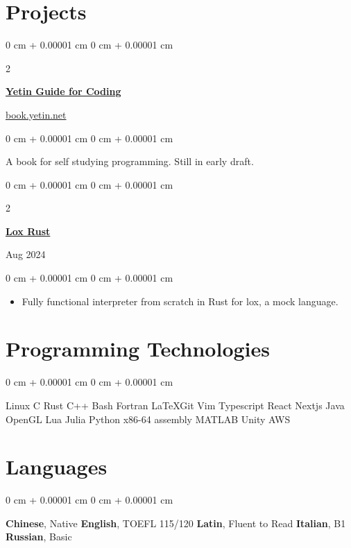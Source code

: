 \documentclass[10pt, letterpaper]{article}
\newenvironment{highlights}{
    \begin{itemize}[
        topsep=0.10 cm,
        parsep=0.10 cm,
        partopsep=0pt,
        itemsep=0pt,
        leftmargin=0 cm + 10pt
    ]
}{
    \end{itemize}
} %
\newenvironment{onecolentry}{
    \begin{adjustwidth}{
        0 cm + 0.00001 cm
    }{
        0 cm + 0.00001 cm
    }
}{
    \end{adjustwidth}
} %
\newenvironment{twocolentry}[2][]{
    \onecolentry
    \def\secondColumn{#2}
    \setcolumnwidth{\fill, 4.5 cm}
    \begin{paracol}{2}
}{
    \switchcolumn \raggedleft \secondColumn
    \end{paracol}
    \endonecolentry
} %
\begin{document}
    
    \section{Projects}

        \begin{twocolentry}{
            \href{https://book.yetin.net}{book.yetin.net}
        }
		\href{https://book.yetin.net}{\textbf{Yetin Guide for Coding}}
		\end{twocolentry}
        \vspace{0.10 cm}
        \begin{onecolentry}
			A book for self studying programming. Still in early  draft.
        \end{onecolentry}
        \vspace{0.2 cm}

        \begin{twocolentry}{
            Aug 2024
		}
			\href{https://github.com/harryhanYuhao/lox-rust.git}{\textbf{Lox Rust}}
		\end{twocolentry}
        \vspace{0.10 cm}
        \begin{onecolentry}
            \begin{highlights}
                \item Fully functional interpreter from scratch in Rust for lox, a mock language.
            \end{highlights}
        \end{onecolentry}


	\section{Programming Technologies}
        \begin{onecolentry}
			Linux \textbullet{} C \textbullet{} Rust \textbullet{} C++ \textbullet{} Bash \textbullet{} Fortran \textbullet{} \LaTeX \textbullet Git \textbullet Vim \textbullet Typescript \textbullet React \textbullet Nextjs \textbullet Java
			OpenGL \textbullet Lua \textbullet{} Julia \textbullet Python \textbullet{} x86-64 assembly \textbullet{} MATLAB \textbullet{} Unity \textbullet AWS

        \end{onecolentry}

        \vspace{0.2 cm}

	\section{Languages}
	\begin{onecolentry}
		\textbf{Chinese}, Native
		\textbullet{} 
		\textbf{English}, TOEFL 115/120 
		\textbullet{} 
		\textbf{Latin}, Fluent to Read
		\textbullet{} 
		\textbf{Italian}, B1
		\textbullet{}
		\textbf{Russian}, Basic 
	\end{onecolentry}
\end{document}
